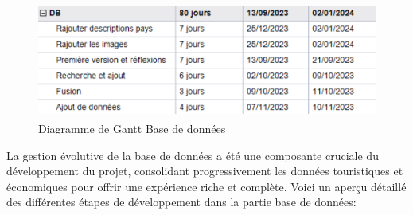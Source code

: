 \documentclass[mstat,12pt]{unswthesis}
\begin{document}
\begin{adjustwidth}{-2cm}{}
\begin{figure}
\centering
\includegraphics[width=12cm,height=3.82cm]{images/db_gantt.png}
\caption{Diagramme de Gantt Base de données}
\end{figure}

La gestion évolutive de la base de données a été une composante cruciale
du développement du projet, consolidant progressivement les données
touristiques et économiques pour offrir une expérience riche et
complète. Voici un aperçu détaillé des différentes étapes de
développement dans la partie base de données:


\end{adjustwidth}
\end{document}

